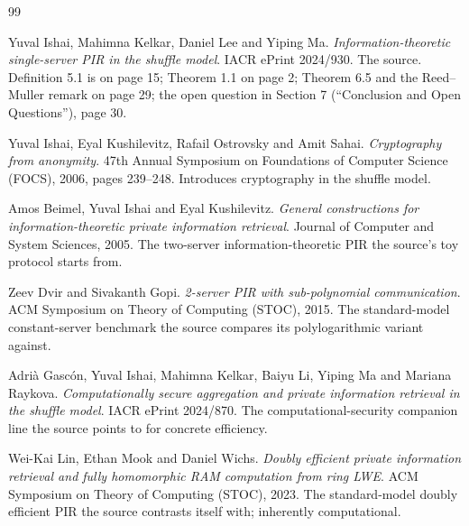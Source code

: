 \documentclass{aicr-conjecture}
\begin{document}
\begin{aicrbibliography}{99}

Yuval Ishai, Mahimna Kelkar, Daniel Lee and Yiping Ma.
\emph{Information-theoretic single-server PIR in the shuffle model}.
IACR ePrint 2024/930.
The source. Definition 5.1 is on page 15; Theorem 1.1 on page 2;
Theorem 6.5 and the Reed--Muller remark on page 29; the open question in
Section 7 (``Conclusion and Open Questions''), page 30.

Yuval Ishai, Eyal Kushilevitz, Rafail Ostrovsky and Amit Sahai.
\emph{Cryptography from anonymity}.
47th Annual Symposium on Foundations of Computer Science (FOCS), 2006,
pages 239--248.
Introduces cryptography in the shuffle model.

Amos Beimel, Yuval Ishai and Eyal Kushilevitz.
\emph{General constructions for information-theoretic private
information retrieval}.
Journal of Computer and System Sciences, 2005.
The two-server information-theoretic PIR the source's toy protocol
starts from.

Zeev Dvir and Sivakanth Gopi.
\emph{2-server PIR with sub-polynomial communication}.
ACM Symposium on Theory of Computing (STOC), 2015.
The standard-model constant-server benchmark the source compares its
polylogarithmic variant against.

Adri\`a Gasc\'on, Yuval Ishai, Mahimna Kelkar, Baiyu Li, Yiping Ma and
Mariana Raykova.
\emph{Computationally secure aggregation and private information
retrieval in the shuffle model}.
IACR ePrint 2024/870.
The computational-security companion line the source points to for
concrete efficiency.

Wei-Kai Lin, Ethan Mook and Daniel Wichs.
\emph{Doubly efficient private information retrieval and fully
homomorphic RAM computation from ring LWE}.
ACM Symposium on Theory of Computing (STOC), 2023.
The standard-model doubly efficient PIR the source contrasts itself
with; inherently computational.

\end{aicrbibliography}
\end{document}
